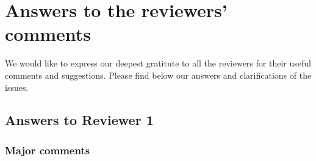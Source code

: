\documentclass{article}%
\begin{document}
\section*{Answers to the reviewers' comments
}


We would like to express our deepest gratitute to all the reviewers for their useful comments and suggestions.
Please find below our answers and clarifications of the issues.


\subsection*{Answers to Reviewer 1}

\subsubsection*{Major comments}
\end{document}

